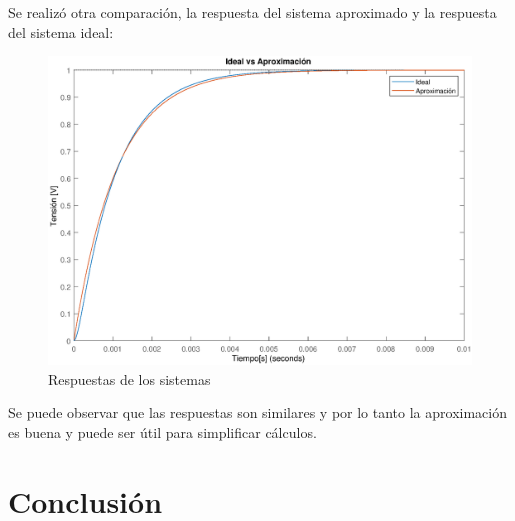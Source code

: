 \documentclass[10pt,a4paper]{article} %
\begin{document}
Se realizó otra comparación, la respuesta del sistema aproximado y la respuesta del sistema ideal:

 \begin{figure}[H]
	\begin{center}
		\includegraphics[scale=0.5]{comp2}
		\caption{Respuestas de los sistemas}
	\end{center}
\end{figure}

Se puede observar que las respuestas son similares y por lo tanto la aproximación es buena y puede ser útil para simplificar cálculos.
 
\section{Conclusión}

\end{document}
